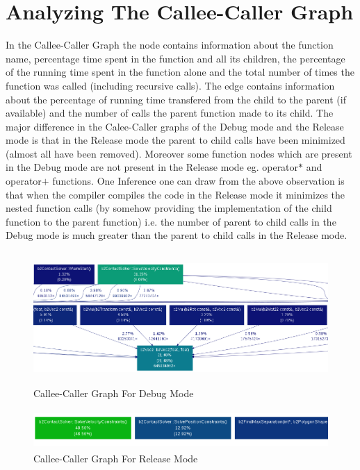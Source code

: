 \documentclass[11pt]{article}
\begin{document}
\section{Analyzing The Callee-Caller Graph}
	In the Callee-Caller Graph the node contains information about the function name, percentage time spent in the function and all its children, the percentage of the running time spent in the function alone and the total number of times the function was called (including recursive calls). The edge contains information about the percentage of running time transfered from the child to the parent (if available) and the number of calls the parent function made to its child.\newline
	The major difference in the Calee-Caller graphs of the Debug mode and the Release mode is that in the Release mode the parent to child calls have been minimized (almost all have been removed). Moreover some function nodes which are present in the Debug mode are not present in the Release mode eg. operator$*$ and operator$+$ functions.\newline
	One Inference one can draw from the above observation is that when the compiler compiles the code in the Release mode it minimizes the nested function calls (by somehow providing the implementation of the child function to the parent function) i.e. the number of parent to child calls in the Debug mode is much greater than the parent to child calls in the Release mode. 

	\begin{figure}\begin{center}\includegraphics[height=5cm,width=20cm]{debug_1000_crop.png}\caption{Callee-Caller Graph For Debug Mode}\end{center}\end{figure}
	\begin{figure}\begin{center}\includegraphics[height=1.5cm,width=15cm]{release_1000_crop.png}\caption{Callee-Caller Graph For Release Mode}\end{center}\end{figure}
\end{document}
